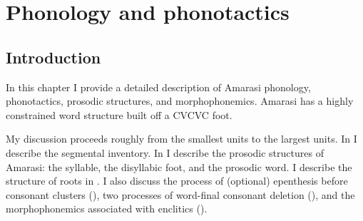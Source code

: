 \chapter{Phonology and phonotactics}\label{ch:AmaPho}

\section{Introduction}
In this chapter I provide a detailed description of Amarasi
phonology, phonotactics, prosodic structures, and morphophonemics.
Amarasi has a highly constrained word structure built off a CVCVC foot.

My discussion proceeds roughly from the
smallest units to the largest units.
In  I describe the segmental inventory.
In  I describe the prosodic structures
of Amarasi: the syllable, the disyllabic foot, and the prosodic word.
I describe the structure of roots in .
I also discuss the process of (optional) epenthesis
before consonant clusters (),
two processes of word-final consonant deletion (),
and the morphophonemics associated with enclitics ().


	





	
	


	
	
	
	
	
	


	
	
		
	
	
	
	
	





%
